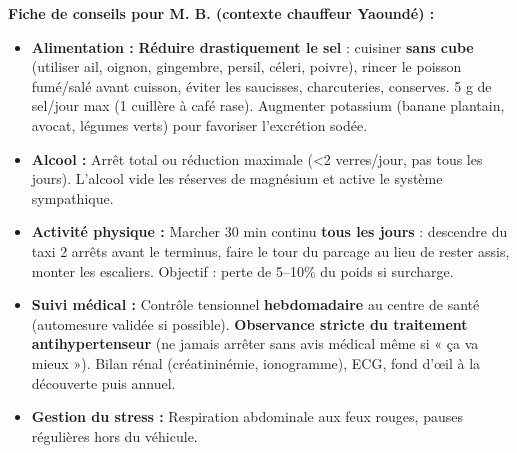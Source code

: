 \documentclass[11pt]{article}
\begin{document}
\begin{exoresolu}
\textbf{Fiche de conseils pour M. B. (contexte chauffeur Yaoundé) :}
\begin{itemize}
\item \textbf{Alimentation :} \textbf{Réduire drastiquement le sel} : cuisiner \textbf{sans cube} (utiliser ail, oignon, gingembre, persil, céleri, poivre), rincer le poisson fumé/salé avant cuisson, éviter les saucisses, charcuteries, conserves. 5 g de sel/jour max (1 cuillère à café rase). Augmenter potassium (banane plantain, avocat, légumes verts) pour favoriser l'excrétion sodée.
\item \textbf{Alcool :} Arrêt total ou réduction maximale (\textless 2 verres/jour, pas tous les jours). L'alcool vide les réserves de magnésium et active le système sympathique.
\item \textbf{Activité physique :} Marcher 30 min continu \textbf{tous les jours} : descendre du taxi 2 arrêts avant le terminus, faire le tour du parcage au lieu de rester assis, monter les escaliers. Objectif : perte de 5--10\% du poids si surcharge.
\item \textbf{Suivi médical :} Contrôle tensionnel \textbf{hebdomadaire} au centre de santé (automesure validée si possible). \textbf{Observance stricte du traitement antihypertenseur} (ne jamais arrêter sans avis médical même si « ça va mieux »). Bilan rénal (créatininémie, ionogramme), ECG, fond d'œil à la découverte puis annuel.
\item \textbf{Gestion du stress :} Respiration abdominale aux feux rouges, pauses régulières hors du véhicule.
\end{itemize}
\end{exoresolu}
\end{document}
